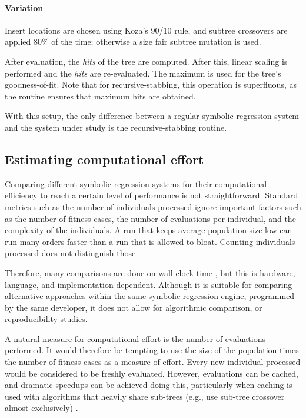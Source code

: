 \documentclass{llncs}
\begin{document}
\paragraph{Variation}
Insert locations are chosen using Koza's 90/10 rule, and subtree crossovers are applied 80\% of the time; otherwise a size fair subtree mutation is used.

After evaluation, the \emph{hits} of the tree are computed. After this, linear scaling is performed and the \emph{hits} are re-evaluated. The maximum is used for the tree's goodness-of-fit. Note that for recursive-stabbing, this operation is superfluous, as the routine ensures that maximum hits are obtained.   

With this setup, the only difference between a regular symbolic regression system and the system under study is the recursive-stabbing routine. 

\subsection{Estimating computational effort}

Comparing different symbolic regression systems for their computational efficiency to reach a certain level of performance is not straightforward. Standard metrics such as the number of individuals processed ignore important factors such as the number of fitness cases, the number of evaluations per individual, and the complexity of the individuals. A run that keeps average population size low can run many orders faster than a run that is allowed to bloat. Counting individuals processed does not distinguish those

Therefore, many comparisons are done on wall-clock time \cite{krawiec, bosman}, but this is hardware, language, and implementation dependent. Although it is suitable for comparing alternative approaches within the same symbolic regression engine, programmed by the same developer, it does not allow for algorithmic comparison, or reproducibility studies. 

A natural measure for computational effort is the number of evaluations performed. It would therefore be tempting to use the size of the population times the number of fitness cases as a measure of effort. Every new individual processed would be considered to be freshly evaluated. However, evaluations can be cached, and dramatic speedups can be achieved doing this, particularly when caching is used with algorithms that heavily share sub-trees (e.g., use sub-tree crossover almost exclusively)  \cite{alternatives-in-caching}.
\end{document}
